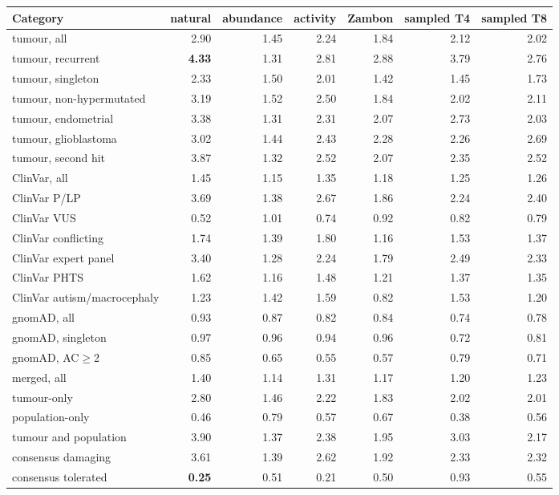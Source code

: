 \documentclass[11pt,a4paper]{article}
\begin{document}
\begin{table}[H]
\centering\small
\begin{tabular}{@{}lrrrrrr@{}}
\toprule
Category & natural & abundance & activity & Zambon & sampled T4 & sampled T8 \\
\midrule
tumour, all & 2.90 & 1.45 & 2.24 & 1.84 & 2.12 & 2.02 \\
tumour, recurrent & \textbf{4.33} & 1.31 & 2.81 & 2.88 & 3.79 & 2.76 \\
tumour, singleton & 2.33 & 1.50 & 2.01 & 1.42 & 1.45 & 1.73 \\
tumour, non-hypermutated & 3.19 & 1.52 & 2.50 & 1.84 & 2.02 & 2.11 \\
tumour, endometrial & 3.38 & 1.31 & 2.31 & 2.07 & 2.73 & 2.03 \\
tumour, glioblastoma & 3.02 & 1.44 & 2.43 & 2.28 & 2.26 & 2.69 \\
tumour, second hit & 3.87 & 1.32 & 2.52 & 2.07 & 2.35 & 2.52 \\
ClinVar, all & 1.45 & 1.15 & 1.35 & 1.18 & 1.25 & 1.26 \\
ClinVar P/LP & 3.69 & 1.38 & 2.67 & 1.86 & 2.24 & 2.40 \\
ClinVar VUS & 0.52 & 1.01 & 0.74 & 0.92 & 0.82 & 0.79 \\
ClinVar conflicting & 1.74 & 1.39 & 1.80 & 1.16 & 1.53 & 1.37 \\
ClinVar expert panel & 3.40 & 1.28 & 2.24 & 1.79 & 2.49 & 2.33 \\
ClinVar PHTS & 1.62 & 1.16 & 1.48 & 1.21 & 1.37 & 1.35 \\
ClinVar autism/macrocephaly & 1.23 & 1.42 & 1.59 & 0.82 & 1.53 & 1.20 \\
gnomAD, all & 0.93 & 0.87 & 0.82 & 0.84 & 0.74 & 0.78 \\
gnomAD, singleton & 0.97 & 0.96 & 0.94 & 0.96 & 0.72 & 0.81 \\
gnomAD, AC$\ge$2 & 0.85 & 0.65 & 0.55 & 0.57 & 0.79 & 0.71 \\
merged, all & 1.40 & 1.14 & 1.31 & 1.17 & 1.20 & 1.23 \\
tumour-only & 2.80 & 1.46 & 2.22 & 1.83 & 2.02 & 2.01 \\
population-only & 0.46 & 0.79 & 0.57 & 0.67 & 0.38 & 0.56 \\
tumour and population & 3.90 & 1.37 & 2.38 & 1.95 & 3.03 & 2.17 \\
consensus damaging & 3.61 & 1.39 & 2.62 & 1.92 & 2.33 & 2.32 \\
consensus tolerated & \textbf{0.25} & 0.51 & 0.21 & 0.50 & 0.93 & 0.55 \\

\end{tabular}
\end{table}
\end{document}
